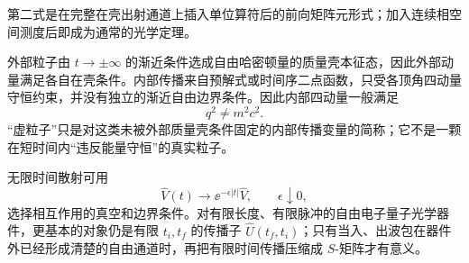 第二式是在完整在壳出射通道上插入单位算符后的前向矩阵元形式；加入连续相空间测度后即成为通常的光学定理。

外部粒子由 $t\to\pm\infty$ 的渐近条件选成自由哈密顿量的质量壳本征态，因此外部动量满足各自在壳条件。内部传播来自预解式或时间序二点函数，只受各顶角四动量守恒约束，并没有独立的渐近自由边界条件。因此内部四动量一般满足
\begin{equation*}
 q^2\neq m^2c^2.
\end{equation*}
“虚粒子”只是对这类未被外部质量壳条件固定的内部传播变量的简称；它不是一颗在短时间内“违反能量守恒”的真实粒子。

\begin{note}[$S$ 矩阵与有限时间传播]
无限时间散射可用
\begin{equation*}
 \hat V(t)\longrightarrow
 \ee^{-\epsilon|t|}\hat V,
 \qquad
 \epsilon\downarrow0,
\end{equation*}
选择相互作用的真空和边界条件。对有限长度、有限脉冲的自由电子量子光学器件，更基本的对象仍是有限 $t_i,t_f$ 的传播子 $\hat U(t_f,t_i)$；只有当入、出波包在器件外已经形成清楚的自由通道时，再把有限时间传播压缩成 $S$-矩阵才有意义。
\end{note}

